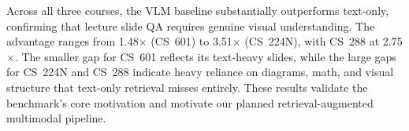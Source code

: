 \documentclass{article} %
\begin{document}
Across all three courses, the VLM baseline substantially outperforms text-only, confirming that lecture slide QA requires genuine visual understanding. The advantage ranges from 1.48$\times$ (CS~601) to 3.51$\times$ (CS~224N), with CS~288 at 2.75$\times$. The smaller gap for CS~601 reflects its text-heavy slides, while the large gaps for CS~224N and CS~288 indicate heavy reliance on diagrams, math, and visual structure that text-only retrieval misses entirely. These results validate the benchmark's core motivation and motivate our planned retrieval-augmented multimodal pipeline.



\end{document}
